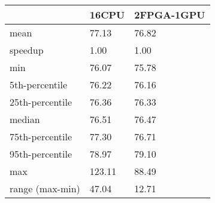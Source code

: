 \begin{tabular}{lll}
\toprule
 & 16CPU & 2FPGA-1GPU \\
\midrule
mean & 77.13 & 76.82 \\
speedup & 1.00 & 1.00 \\
min & 76.07 & 75.78 \\
5th-percentile & 76.22 & 76.16 \\
25th-percentile & 76.36 & 76.33 \\
median & 76.51 & 76.47 \\
75th-percentile & 77.30 & 76.71 \\
95th-percentile & 78.97 & 79.10 \\
max & 123.11 & 88.49 \\
range (max-min) & 47.04 & 12.71 \\
\bottomrule
\end{tabular}

